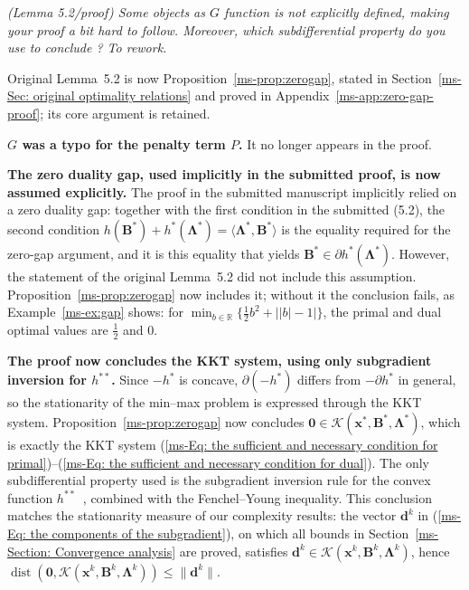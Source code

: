 \documentclass[11pt]{article}
\newcommand{\mref}[1]{\ref*{ms-#1}}
\newcommand{\meq}[1]{(\mref{#1})}
\newcommand{\RR}{\mathbb{R}}
\newcommand{\dist}{\operatorname{dist}}
\newcommand{\zero}{\bm{0}}
\newcommand{\calK}{\mathcal{K}}
\newcommand{\bB}{\bm{B}}
\newcommand{\bd}{\bm{d}}
\newcommand{\bLmbd}{\bm{\Lambda}}
\newcommand{\bx}{\bm{x}}
\let\reviewitem\item
\newenvironment{qalist}{\begin{description}[leftmargin=0pt,labelindent=0pt,itemsep=0.8em,parsep=0.5em,font=\normalfont\upshape\bfseries]}{\end{description}}
\begin{document}
\begin{qalist}
\item[{Q39.}] {\itshape (Lemma 5.2/proof) Some objects as $G$ function is not explicitly defined, making your proof a bit hard to follow. Moreover, which subdifferential property do you use to conclude ? To rework.}
\item[Response:] Original Lemma~5.2 is now Proposition~\mref{prop:zerogap}, stated in Section~\mref{Sec: original optimality relations} and proved in Appendix~\mref{app:zero-gap-proof}; its core argument is retained.
\begin{enumerate}[label={[\roman*]},before=\let\item\reviewitem]
\item \textbf{$G$ was a typo for the penalty term $P$.} It no longer appears in the proof.
\item \textbf{The zero duality gap, used implicitly in the submitted proof, is now assumed explicitly.} The proof in the submitted manuscript implicitly relied on a zero duality gap: together with the first condition in the submitted (5.2), the second condition $h(\bB^*)+h^*(\bLmbd^*)=\langle\bLmbd^*,\bB^*\rangle$ is the equality required for the zero-gap argument, and it is this equality that yields $\bB^*\in\partial h^*(\bLmbd^*)$. However, the statement of the original Lemma~5.2 did not include this assumption. Proposition~\mref{prop:zerogap} now includes it; without it the conclusion fails, as Example~\mref{ex:gap} shows: for $\min_{b\in\RR}\{\frac12b^2+\bigl||b|-1\bigr|\}$, the primal and dual optimal values are $\frac12$ and $0$.
\item \textbf{The proof now concludes the KKT system, using only subgradient inversion for $h^{**}$.} Since $-h^*$ is concave, $\partial(-h^*)$ differs from $-\partial h^*$ in general, so the stationarity of the min--max problem is expressed through the KKT system. Proposition~\mref{prop:zerogap} now concludes $\zero\in\calK(\bx^*,\bB^*,\bLmbd^*)$, which is exactly the KKT system \meq{Eq: the sufficient and necessary condition for primal}--\meq{Eq: the sufficient and necessary condition for dual}. The only subdifferential property used is the subgradient inversion rule for the convex function $h^{**}$~\cite[Theorem~23.5]{rockafellar1970convex}, combined with the Fenchel--Young inequality. This conclusion matches the stationarity measure of our complexity results: the vector $\bd^k$ in \meq{Eq: the components of the subgradient}, on which all bounds in Section~\mref{Section: Convergence analysis} are proved, satisfies $\bd^k\in\calK(\bx^k,\bB^k,\bLmbd^k)$, hence $\dist(\zero,\calK(\bx^k,\bB^k,\bLmbd^k))\le\|\bd^k\|$.

\end{enumerate}
\end{qalist}
\end{document}
